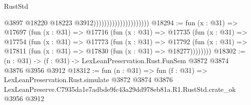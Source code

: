 \begin{lexlean}{RustStd}
\begin{coremodule}
                                              @3897
                                              @18220
                                              @18223
                                              @3912)))))))))))))))))))))
@18294 := fun (x : @31) =>
  @17697
    (fun (x : @31) =>
    @17716
      (fun (x : @31) =>
      @17735
        (fun (x : @31) =>
        @17754
          (fun (x : @31) =>
          @17773
            (fun (x : @31) =>
            @17792
              (fun (x : @31) => @17811 (fun (x : @31) => @17830 (fun (x : @31) => @18277))))))))
@18302 := (n : @31) -> (f : @31) -> LexLeanPreservation.Rust.FunSem @3872 @3874 @3876 @3956 @3912
@18312 := fun (n : @31) =>
  fun (f : @31) =>
  LexLeanPreservation.Rust.simulate
    @3872
    @3874
    @3876
    LexLeanPreserve.C7935da1e7adbde9fc43a29dd978eb81a.R1.RustStd.crate_ok
    @3956
    @3912
\end{coremodule}
\end{lexlean}
